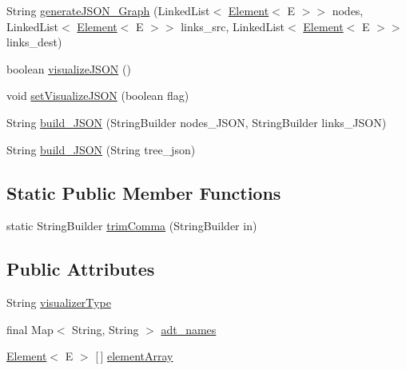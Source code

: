 \begin{DoxyCompactItemize}
\item 
String \hyperlink{classbridges_1_1base_1_1_a_d_t_visualizer_aabf7cbfbed0cd28b365206281176834b}{generate\+J\+S\+O\+N\+\_\+\+Graph} (Linked\+List$<$ \hyperlink{classbridges_1_1base_1_1_element}{Element}$<$ E $>$$>$ nodes, Linked\+List$<$ \hyperlink{classbridges_1_1base_1_1_element}{Element}$<$ E $>$$>$ links\+\_\+src, Linked\+List$<$ \hyperlink{classbridges_1_1base_1_1_element}{Element}$<$ E $>$$>$ links\+\_\+dest)
\item 
boolean \hyperlink{classbridges_1_1base_1_1_a_d_t_visualizer_a1aa47f3633239060197b523cb6b86e06}{visualize\+J\+S\+ON} ()
\item 
void \hyperlink{classbridges_1_1base_1_1_a_d_t_visualizer_a784ce15d23e6c8ff0d6e77f2274e2980}{set\+Visualize\+J\+S\+ON} (boolean flag)
\item 
String \hyperlink{classbridges_1_1base_1_1_a_d_t_visualizer_a86ec26c0bb98a48a63366ce380ca958f}{build\+\_\+\+J\+S\+ON} (String\+Builder nodes\+\_\+\+J\+S\+ON, String\+Builder links\+\_\+\+J\+S\+ON)
\item 
String \hyperlink{classbridges_1_1base_1_1_a_d_t_visualizer_a520eef21260f327101b7e013f9814c45}{build\+\_\+\+J\+S\+ON} (String tree\+\_\+json)
\end{DoxyCompactItemize}
\subsection*{Static Public Member Functions}
\begin{DoxyCompactItemize}
\item 
static String\+Builder \hyperlink{classbridges_1_1base_1_1_a_d_t_visualizer_af9ce115911ca745c6710b6faddfc0650}{trim\+Comma} (String\+Builder in)
\end{DoxyCompactItemize}
\subsection*{Public Attributes}
\begin{DoxyCompactItemize}
\item 
String \hyperlink{classbridges_1_1base_1_1_a_d_t_visualizer_a288aece657b5641f48e839b34f3884b9}{visualizer\+Type}
\item 
final Map$<$ String, String $>$ \hyperlink{classbridges_1_1base_1_1_a_d_t_visualizer_a6646d020143637569d607fa109c71ff9}{adt\+\_\+names}
\item 
\hyperlink{classbridges_1_1base_1_1_element}{Element}$<$ E $>$ \mbox{[}$\,$\mbox{]} \hyperlink{classbridges_1_1base_1_1_a_d_t_visualizer_a320739b4be463d3987b3de2463b0d592}{element\+Array}
\end{DoxyCompactItemize}
